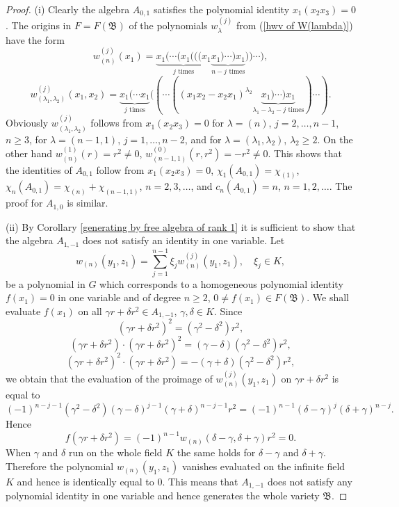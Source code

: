 \documentclass{amsart}[12pt]
\theoremstyle{definition}
\begin{document}
\begin{proof}
(i) Clearly the algebra $A_{0,1}$ satisfies the polynomial identity $x_1(x_2x_3)=0$. The origins in $F=F({\mathfrak B})$ of the polynomials
$w_{\lambda}^{(j)}$ from (\ref{hwv of W(lambda)}) have the form
\[
w_{(n)}^{(j)}(x_1)=\underbrace{x_1(\cdots (x_1(((x_1}_{j\text{ times}}\underbrace{x_1)\cdots )x_1}_{n-j\text{ times}}))\cdots),
\]
\[
w_{(\lambda_1,\lambda_2)}^{(j)}(x_1,x_2)
=\underbrace{x_1(\cdots x_1}_{j\text{ times}}((\cdots((x_1x_2-x_2x_1)^{\lambda_2}\underbrace{x_1)\cdots )x_1}_{\lambda_1-\lambda_2-j\text{ times}})\cdots).
\]
Obviously $w_{(\lambda_1,\lambda_2)}^{(j)}$ follows from $x_1(x_2x_3)=0$ for $\lambda=(n)$, $j=2,\ldots,n-1$, $n\geq 3$,
for $\lambda=(n-1,1)$, $j=1,\ldots,n-2$, and for $\lambda=(\lambda_1,\lambda_2)$, $\lambda_2\geq 2$.
On the other hand $w_{(n)}^{(1)}(r)=r^2\not=0$, $w_{(n-1,1)}^{(0)}(r,r^2)=-r^2\not=0$. This shows that the identities of $A_{0,1}$ follow from $x_1(x_2x_3)=0$,
$\chi_1(A_{0,1})=\chi_{(1)}$, $\chi_n(A_{0,1})=\chi_{(n)}+\chi_{(n-1,1)}$, $n=2,3,\ldots$, and $c_n(A_{0,1})=n$, $n=1,2,\ldots$. The proof for $A_{1,0}$ is similar.

(ii) By Corollary \ref{generating by free algebra of rank 1} it is sufficient to show that the algebra $A_{1,-1}$ does not satisfy an identity in one variable.
Let
\[
w_{(n)}(y_1,z_1)=\sum_{j=1}^{n-1}\xi_jw_{(n)}^{(j)}(y_1,z_1),\quad \xi_j\in K,
\]
be a polynomial in $G$ which corresponds to a homogeneous polynomial identity $f(x_1)=0$ in one variable and of degree $n\geq 2$,
$0\not=f(x_1)\in F({\mathfrak B})$. We shall evaluate $f(x_1)$ on all $\gamma r+\delta r^2\in A_{1,-1}$, $\gamma,\delta\in K$.
Since
\[
(\gamma r+\delta r^2)^2=(\gamma^2-\delta^2)r^2,
\]
\[
(\gamma r+\delta r^2)\cdot(\gamma r+\delta r^2)^2=(\gamma-\delta)(\gamma^2-\delta^2)r^2,
\]
\[
(\gamma r+\delta r^2)^2\cdot(\gamma r+\delta r^2)=-(\gamma+\delta)(\gamma^2-\delta^2)r^2,
\]
we obtain that the evaluation of the proimage of $w_{(n)}^{(j)}(y_1,z_1)$ on $\gamma r+\delta r^2$ is equal to
\[
(-1)^{n-j-1}(\gamma^2-\delta^2)(\gamma-\delta)^{j-1}(\gamma+\delta)^{n-j-1}r^2=(-1)^{n-1}(\delta-\gamma)^j(\delta+\gamma)^{n-j}.
\]
Hence
\[
f(\gamma r+\delta r^2)=(-1)^{n-1}w_{(n)}(\delta-\gamma,\delta+\gamma)r^2=0.
\]
When $\gamma$ and $\delta$ run on the whole field $K$ the same holds for $\delta-\gamma$ and $\delta+\gamma$. Therefore the polynomial
$w_{(n)}(y_1,z_1)$ vanishes evaluated on the infinite field $K$ and hence is identically equal to 0. This means that
$A_{1,-1}$ does not satisfy any polynomial identity in one variable and hence generates the whole variety $\mathfrak B$.
\end{proof}
\end{document}
